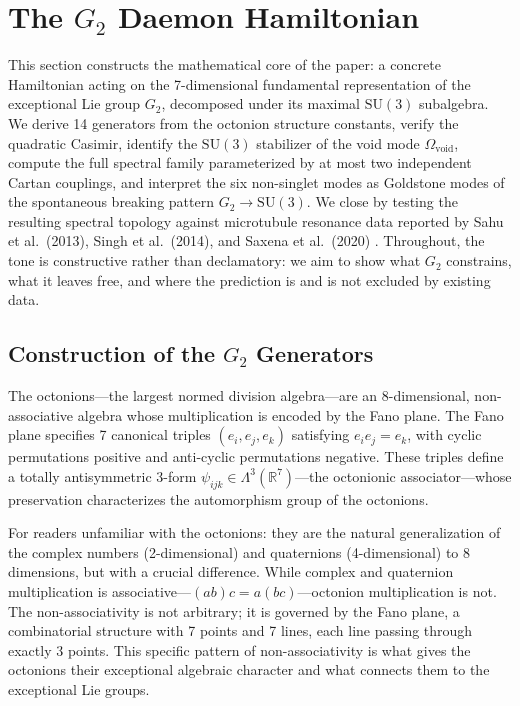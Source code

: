 \documentclass[12pt,a4paper]{article}
\begin{document}
\section{The $G_2$ Daemon Hamiltonian}

This section constructs the mathematical core of the paper: a concrete Hamiltonian acting on the 7-dimensional fundamental representation of the exceptional Lie group $G_2$, decomposed under its maximal $\mathrm{SU}(3)$ subalgebra. We derive 14 generators from the octonion structure constants, verify the quadratic Casimir, identify the $\mathrm{SU}(3)$ stabilizer of the void mode $\Omega_{\mathrm{void}}$, compute the full spectral family parameterized by at most two independent Cartan couplings, and interpret the six non-singlet modes as Goldstone modes of the spontaneous breaking pattern $G_2 \to \mathrm{SU}(3)$. We close by testing the resulting spectral topology against microtubule resonance data reported by Sahu et al.\ (2013), Singh et al.\ (2014), and Saxena et al.\ (2020) \citep{Sahu2013,Singh2014,Saxena2020}. Throughout, the tone is constructive rather than declamatory: we aim to show what $G_2$ constrains, what it leaves free, and where the prediction is and is not excluded by existing data.

\subsection{Construction of the $G_2$ Generators}

The octonions---the largest normed division algebra---are an 8-dimensional, non-associative algebra whose multiplication is encoded by the Fano plane. The Fano plane specifies 7 canonical triples $(e_i, e_j, e_k)$ satisfying $e_i e_j = e_k$, with cyclic permutations positive and anti-cyclic permutations negative. These triples define a totally antisymmetric 3-form $\psi_{ijk} \in \Lambda^3(\mathbb{R}^7)$---the octonionic associator---whose preservation characterizes the automorphism group of the octonions.

For readers unfamiliar with the octonions: they are the natural generalization of the complex numbers (2-dimensional) and quaternions (4-dimensional) to 8 dimensions, but with a crucial difference. While complex and quaternion multiplication is associative---$(ab)c = a(bc)$---octonion multiplication is not. The non-associativity is not arbitrary; it is governed by the Fano plane, a combinatorial structure with 7 points and 7 lines, each line passing through exactly 3 points. This specific pattern of non-associativity is what gives the octonions their exceptional algebraic character and what connects them to the exceptional Lie groups.
\end{document}
